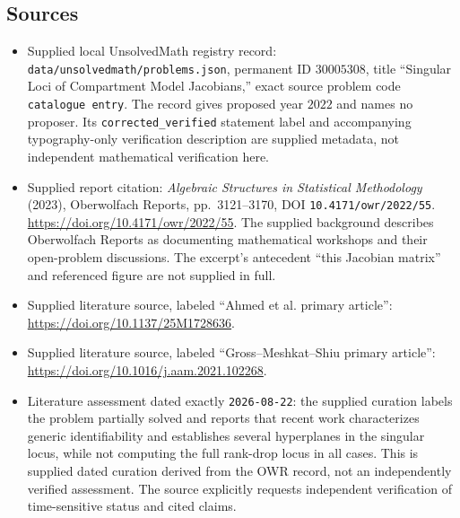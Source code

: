 \documentclass[11pt]{article}
\begin{document}
\subsection{Sources}
\begin{itemize}
\item Supplied local UnsolvedMath registry record: \texttt{data/unsolvedmath/problems.json}, permanent ID \(30005308\), title ``Singular Loci of Compartment Model Jacobians,'' exact source problem code \texttt{catalogue entry}. The record gives proposed year \(2022\) and names no proposer. Its \texttt{corrected\_verified} statement label and accompanying typography-only verification description are supplied metadata, not independent mathematical verification here.
\item Supplied report citation: \emph{Algebraic Structures in Statistical Methodology} (2023), Oberwolfach Reports, pp.\ 3121--3170, DOI \texttt{10.4171/owr/2022/55}. \url{https://doi.org/10.4171/owr/2022/55}. The supplied background describes Oberwolfach Reports as documenting mathematical workshops and their open-problem discussions. The excerpt's antecedent ``this Jacobian matrix'' and referenced figure are not supplied in full.
\item Supplied literature source, labeled ``Ahmed et al. primary article'': \url{https://doi.org/10.1137/25M1728636}.
\item Supplied literature source, labeled ``Gross--Meshkat--Shiu primary article'': \url{https://doi.org/10.1016/j.aam.2021.102268}.
\item Literature assessment dated exactly \texttt{2026-08-22}: the supplied curation labels the problem partially solved and reports that recent work characterizes generic identifiability and establishes several hyperplanes in the singular locus, while not computing the full rank-drop locus in all cases. This is supplied dated curation derived from the OWR record, not an independently verified assessment. The source explicitly requests independent verification of time-sensitive status and cited claims.
\end{itemize}
\end{document}
